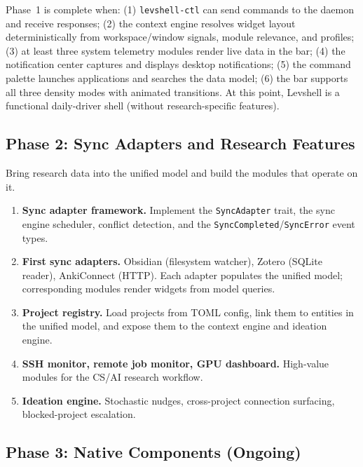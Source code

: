 \documentclass[11pt,a4paper]{article}
\begin{document}
\begin{designbox}
Phase~1 is complete when: (1) \texttt{levshell-ctl} can send commands to the daemon and receive responses; (2) the context engine resolves widget layout deterministically from workspace/window signals, module relevance, and profiles; (3) at least three system telemetry modules render live data in the bar; (4) the notification center captures and displays desktop notifications; (5) the command palette launches applications and searches the data model; (6) the bar supports all three density modes with animated transitions. At this point, Levshell is a functional daily-driver shell (without research-specific features).
\end{designbox}

\subsection{Phase 2: Sync Adapters and Research Features}

Bring research data into the unified model and build the modules that operate on it.

\begin{enumerate}[leftmargin=1.5em, itemsep=4pt]
  \item \textbf{Sync adapter framework.} Implement the \texttt{SyncAdapter} trait, the sync engine scheduler, conflict detection, and the \texttt{SyncCompleted}/\texttt{SyncError} event types.

  \item \textbf{First sync adapters.} Obsidian (filesystem watcher), Zotero (SQLite reader), AnkiConnect (HTTP). Each adapter populates the unified model; corresponding modules render widgets from model queries.

  \item \textbf{Project registry.} Load projects from TOML config, link them to entities in the unified model, and expose them to the context engine and ideation engine.

  \item \textbf{SSH monitor, remote job monitor, GPU dashboard.} High-value modules for the CS/AI research workflow.

  \item \textbf{Ideation engine.} Stochastic nudges, cross-project connection surfacing, blocked-project escalation.
\end{enumerate}

\subsection{Phase 3: Native Components (Ongoing)}
\end{document}
